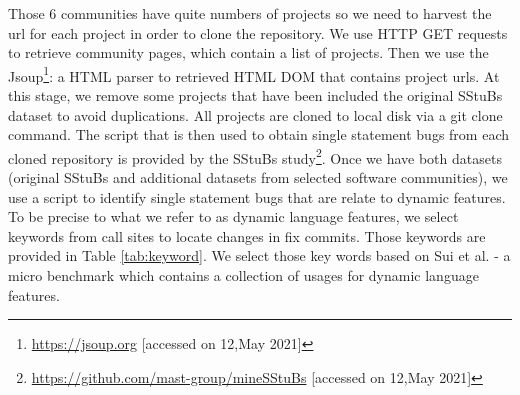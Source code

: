 \documentclass[sigconf,review,anonymous]{acmart}
\begin{document}
Those 6 communities have quite numbers of projects so we need to harvest the url for each project in order to clone the repository. We use HTTP GET requests to retrieve community pages, which contain a list of projects. Then we use the Jsoup\footnote{\url{https://jsoup.org} [accessed on 12,May 2021]}: a HTML parser to retrieved HTML DOM that contains project urls. At this stage, we remove some projects that have been included the original SStuBs dataset to avoid duplications. All projects are cloned to local disk via a git clone command.  
The script that is then used to obtain single statement bugs from each cloned repository is provided by the SStuBs study\footnote{\url{https://github.com/mast-group/mineSStuBs} [accessed on 12,May 2021]}.  Once we have both datasets (original SStuBs and additional datasets from selected software communities), we use a script to identify single statement bugs that are relate to dynamic features. To be precise to what we refer to as dynamic language features, we select keywords from call sites to locate changes in fix commits. Those keywords are provided in Table \ref{tab:keyword}. We select those key words based on Sui et al. \cite{sui2018soundness} - a micro benchmark which contains a collection of usages for dynamic language features.
\end{document}
